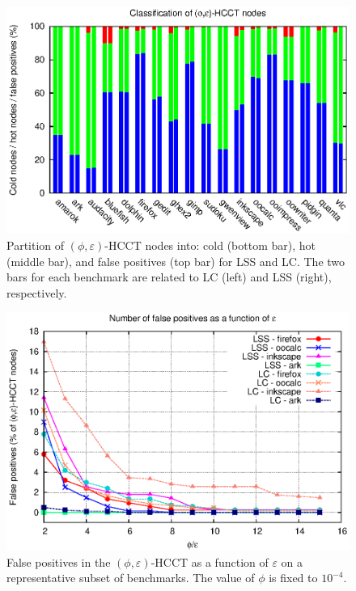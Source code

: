 \documentclass{sigplanconf}
\begin{document}
\begin{figure}[t]
\center\includegraphics[width=\columnwidth]{charts/false-positives.eps}
\caption{Partition of $(\phi,\varepsilon)$-HCCT nodes into: cold (bottom bar), hot (middle bar), and false positives (top bar) for LSS and LC. The two bars for each benchmark are related to LC (left) and LSS (right), respectively.}
\label{fig:falsePositives}
\end{figure} 

\begin{figure}[t]
\center\includegraphics[width=\columnwidth]{charts/false-positives-epsilon.eps}
\caption{False positives in the  $(\phi,\varepsilon)$-HCCT as a function of $\varepsilon$ on a representative subset of benchmarks. The value of $\phi$ is fixed to $10^{-4}$.}
\label{fig:falsePositivesEpsilon}
\end{figure} 
\end{document}
